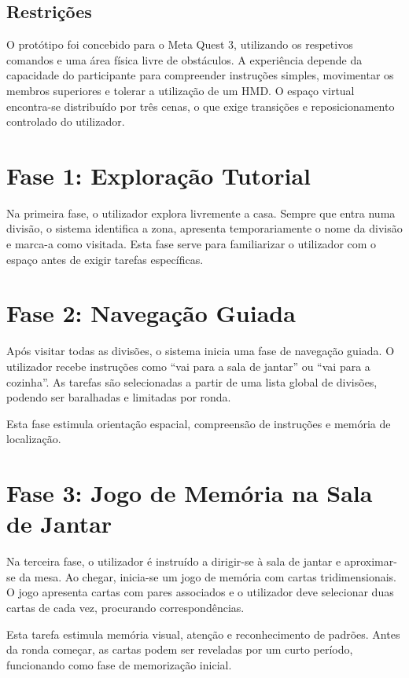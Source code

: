 \documentclass[12pt,a4paper,oneside]{report}
\begin{document}
\subsection{Restrições}

O protótipo foi concebido para o Meta Quest 3, utilizando os respetivos comandos e uma área física livre de obstáculos. A experiência depende da capacidade do participante para compreender instruções simples, movimentar os membros superiores e tolerar a utilização de um \ac{HMD}. O espaço virtual encontra-se distribuído por três cenas, o que exige transições e reposicionamento controlado do utilizador.

\section{Fase 1: Exploração Tutorial}

Na primeira fase, o utilizador explora livremente a casa. Sempre que entra numa divisão, o sistema identifica a zona, apresenta temporariamente o nome da divisão e marca-a como visitada. Esta fase serve para familiarizar o utilizador com o espaço antes de exigir tarefas específicas.

\section{Fase 2: Navegação Guiada}

Após visitar todas as divisões, o sistema inicia uma fase de navegação guiada. O utilizador recebe instruções como ``vai para a sala de jantar'' ou ``vai para a cozinha''. As tarefas são selecionadas a partir de uma lista global de divisões, podendo ser baralhadas e limitadas por ronda.

Esta fase estimula orientação espacial, compreensão de instruções e memória de localização.

\section{Fase 3: Jogo de Memória na Sala de Jantar}

Na terceira fase, o utilizador é instruído a dirigir-se à sala de jantar e aproximar-se da mesa. Ao chegar, inicia-se um jogo de memória com cartas tridimensionais. O jogo apresenta cartas com pares associados e o utilizador deve selecionar duas cartas de cada vez, procurando correspondências.

Esta tarefa estimula memória visual, atenção e reconhecimento de padrões. Antes da ronda começar, as cartas podem ser reveladas por um curto período, funcionando como fase de memorização inicial.
\end{document}
